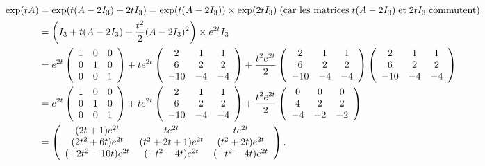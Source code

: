 {\begin{enumerate}
{\begin{align*}\ensuremath
\text{exp}(tA)&=\text{exp}(t(A-2I_3)+2tI_3)=\text{exp}(t(A-2I_3))\times\text{exp}(2tI_3)\;(\text{car les matrices}\;t(A-2I_3)\;\text{et}\;2tI_3\;\text{commutent})\\
 &=\left(I_3+t(A-2I_3)+ \frac{t^2}{2}(A-2I_3)^2\right)\times e^{2t}I_3\\
 &=e^{2t}\left(
\begin{array}{ccc}
1&0&0\\
0&1&0\\
0&0&1
\end{array}
\right)+te^{2t}\left(
\begin{array}{ccc}
2&1&1\\
6&2&2\\
-10&-4&-4
\end{array}
\right)+ \frac{t^2e^{2t}}{2}\left(
\begin{array}{ccc}
2&1&1\\
6&2&2\\
-10&-4&-4
\end{array}
\right)\left(
\begin{array}{ccc}
2&1&1\\
6&2&2\\
-10&-4&-4
\end{array}
\right)
\\
 &=e^{2t}\left(
\begin{array}{ccc}
1&0&0\\
0&1&0\\
0&0&1
\end{array}
\right)+te^{2t}\left(
\begin{array}{ccc}
2&1&1\\
6&2&2\\
-10&-4&-4
\end{array}
\right)+ \frac{t^2e^{2t}}{2}\left(
\begin{array}{ccc}
0&0&0\\
4&2&2\\
-4&-2&-2
\end{array}
\right)\\
 &=\left(
\begin{array}{ccc}
(2t+1)e^{2t}&te^{2t}&te^{2t}\\
(2t^2+6t)e^{2t}&(t^2+2t+1)e^{2t}&(t^2+2t)e^{2t}\\
(-2t^2-10t)e^{2t}&(-t^2-4t)e^{2t}&(-t^2-4t)e^{2t}
\end{array}
\right).
\end{align*}

\begin{center}
\end{center}}
\end{enumerate}
}
